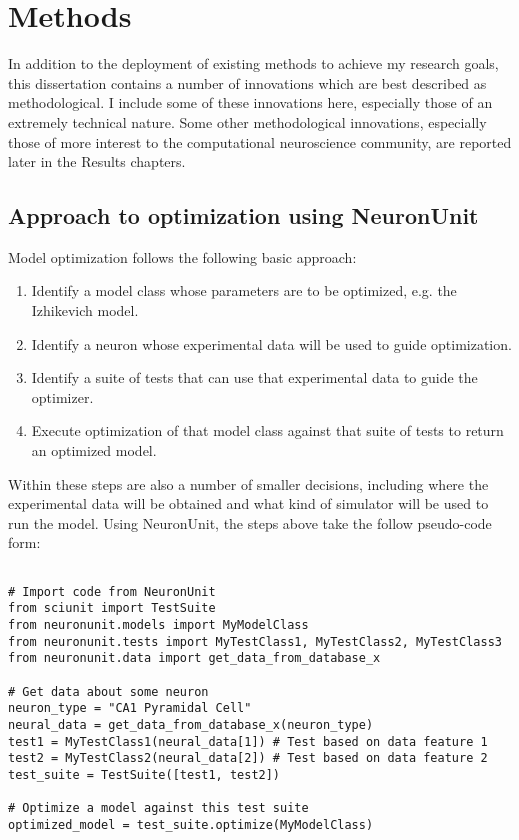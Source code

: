 \chapter{Methods}
In addition to the deployment of existing methods to achieve my research goals, this dissertation contains a number of innovations which are best described as methodological.  I include some of these innovations here, especially those of an extremely technical nature.  Some other methodological innovations, especially those of more interest to the computational neuroscience community, are reported later in the Results chapters.

\section{Approach to optimization using NeuronUnit}
Model optimization follows the following basic approach:
\begin{enumerate}
	\item Identify a model class whose parameters are to be optimized, e.g. the Izhikevich model.
	\item Identify a neuron whose experimental data will be used to guide optimization.
	\item Identify a suite of tests that can use that experimental data to guide the optimizer.
	\item Execute optimization of that model class against that suite of tests to return an optimized model.
\end{enumerate}
Within these steps are also a number of smaller decisions, including where the experimental data will be obtained and what kind of simulator will be used to run the model.
Using NeuronUnit, the steps above take the follow pseudo-code form:
\clearpage
\begin{verbatim}

# Import code from NeuronUnit
from sciunit import TestSuite
from neuronunit.models import MyModelClass
from neuronunit.tests import MyTestClass1, MyTestClass2, MyTestClass3
from neuronunit.data import get_data_from_database_x

# Get data about some neuron
neuron_type = "CA1 Pyramidal Cell"
neural_data = get_data_from_database_x(neuron_type)
test1 = MyTestClass1(neural_data[1]) # Test based on data feature 1
test2 = MyTestClass2(neural_data[2]) # Test based on data feature 2
test_suite = TestSuite([test1, test2])

# Optimize a model against this test suite
optimized_model = test_suite.optimize(MyModelClass)
\end{verbatim}





%
%






